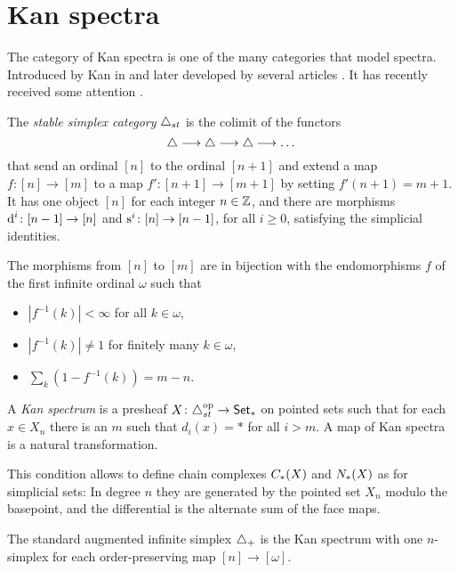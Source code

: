
\section{Kan spectra}\label{s:9Kanspectra}

The category of Kan spectra is one of the many categories that model spectra. Introduced by Kan in \cite{Kan1963} and later developed by several articles \cite{burghelea_kanspectraI1967, burghelea_kanspectraII_1968, burghelea_kanspectraIII1969,Brown1973}. It has recently received some attention \cite{Stephan2015, CKP2023}.

\begin{definition}
    The \emph{stable simplex category} $\triangle_{st}$ is the colimit of the functors
    \[
        \triangle\longrightarrow \triangle\longrightarrow \triangle\longrightarrow \ldots
    \]
    that send an ordinal $[n]$ to the ordinal $[n+1]$ and extend a map $f\colon [n]\to [m]$ to a map $f'\colon [n+1]\to [m+1]$ by setting $f'(n+1) = m+1$. It has one object $[n]$ for each integer $n\in \mathbb{Z}$, and there are morphisms $\operatorname{d}^i\colon [n-1]\to [n]$ and $\operatorname{s}^i\colon [n]\to [n-1]$, for all $i\geq 0$, satisfying the simplicial identities.
\end{definition}
The morphisms from $[n]$ to $[m]$ are in bijection with the endomorphisms $f$ of the first infinite ordinal $\omega$ such that
\begin{itemize}
	\item $|f^{-1}(k)|<\infty$ for all $k\in \omega$,
	\item $|f^{-1}(k)|\neq 1$ for finitely many $k\in \omega$,
	\item $\sum_k (1-f^{-1}(k)) = m-n$.
\end{itemize}
\begin{definition}
    A \emph{Kan spectrum} is a presheaf $X\colon \triangle_{st}^{{\mathrm{op}}}\to \mathsf{Set}_*$ on pointed sets such that for each $x\in X_n$ there is an $m$ such that $d_i(x) = *$ for all $i>m$. A map of Kan spectra is a natural transformation.
\end{definition}

This condition allows to define chain complexes $C_{*}(X)$ and $N_{*}(X)$ as for simplicial sets: In degree $n$ they are generated by the pointed set $X_n$ modulo the basepoint, and the differential is the alternate sum of the face maps.

The standard augmented infinite simplex $\triangle_{+}$ is the Kan spectrum with one $n$-simplex for each order-preserving map $[n]\to [\omega]$.

